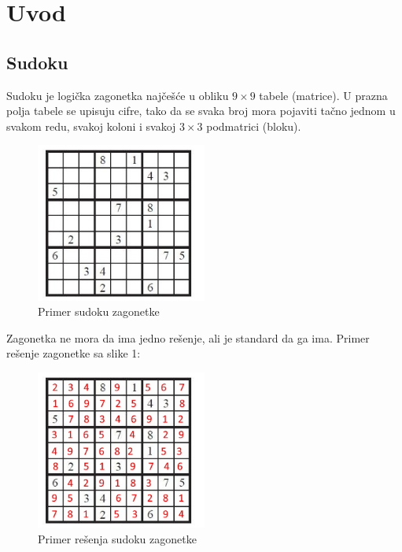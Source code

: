 \documentclass[a4paper]{article}
\begin{document}
    
    
    
    \section{Uvod}
    \subsection{Sudoku}
    Sudoku je logička zagonetka najčešće u obliku $9 \times 9$ tabele (matrice).
    U prazna polja tabele se upisuju cifre, tako da se svaka broj mora pojaviti
    tačno jednom u svakom redu, svakoj koloni i svakoj $3\times 3$ podmatrici (bloku).
    \begin{figure}[h]
        \centering
        \includegraphics[width=0.5\textwidth, height=0.5\textwidth]{img/sudoku-example.jpg}
        \caption{Primer sudoku zagonetke}
    \end{figure}
    \par Zagonetka ne mora da ima jedno rešenje, ali je standard da ga ima. Primer rešenje zagonetke sa slike 1:
    \begin{figure}[h]
        \centering
        \includegraphics[width=0.5\textwidth, height=0.5\textwidth]{img/sudoku-example-sol.jpg}
        \caption{Primer rešenja sudoku zagonetke}
    \end{figure}
    
\end{document}
